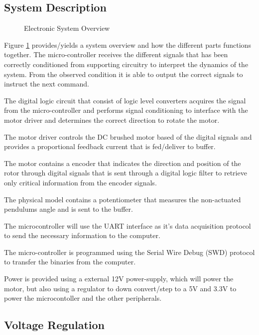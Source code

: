 \documentclass[a4paper,12pt]{article}
\begin{document}
	\subsection{System Description}
	
	\begin{figure}[h]
		\centering
		
		\caption{Electronic System Overview}
		\label{fig:electronicSystemOverview}
	\end{figure}
	
	
	Figure \ref{fig:electronicSystemOverview} provides/yields a system overview and how the different parts functions together. The micro-controller receives the different signals that has been correctly conditioned from supporting circuitry to interpret the dynamics of the system. From the observed condition it is able to output the correct signals to instruct the next command.
	
	The digital logic circuit that consist of logic level converters acquires the signal from the micro-controller and performs signal conditioning to interface with the motor driver and determines the correct direction to rotate the motor. 
	
	The motor driver controls the DC brushed motor based of the digital signals and provides a proportional feedback current that is fed/deliver to buffer.
	
	The motor contains a encoder that indicates the direction and position of the rotor through digital signals that is sent through a digital logic filter to retrieve only critical information from the encoder signals. 
	
	The physical model contains a potentiometer that measures the non-actuated pendulums angle and is sent to the buffer.
	
	The microcontroller will use the UART interface as it's data acquisition protocol to send the necessary information to the computer. 
	
	The micro-controller is programmed using the Serial Wire Debug (SWD) protocol to transfer the binaries from the computer.
	
	Power is provided using a external 12V power-supply, which will power the motor, but also using a regulator to down convert/step to a 5V and 3.3V to power the microcontoller and the other peripherals.
	
	\subsection{Voltage Regulation}
	
\end{document}
